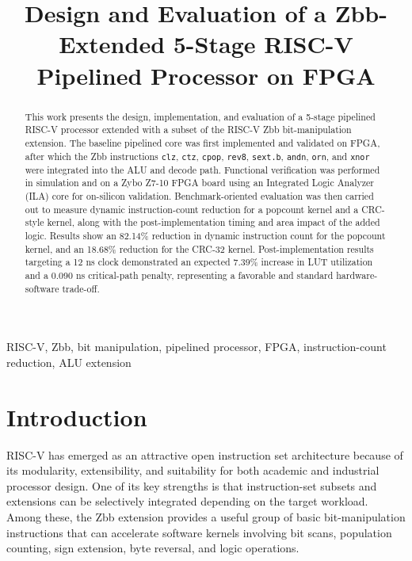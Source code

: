 \documentclass[conference]{IEEEtran}
\begin{document}
	
	\title{Design and Evaluation of a Zbb-Extended 5-Stage RISC-V Pipelined Processor on FPGA}
	
	\author{
	}
	
	\maketitle
	
	\begin{abstract}
		This work presents the design, implementation, and evaluation of a 5-stage pipelined RISC-V processor extended with a subset of the RISC-V Zbb bit-manipulation extension. The baseline pipelined core was first implemented and validated on FPGA, after which the Zbb instructions \texttt{clz}, \texttt{ctz}, \texttt{cpop}, \texttt{rev8}, \texttt{sext.b}, \texttt{andn}, \texttt{orn}, and \texttt{xnor} were integrated into the ALU and decode path. Functional verification was performed in simulation and on a Zybo Z7-10 FPGA board using an Integrated Logic Analyzer (ILA) core for on-silicon validation. Benchmark-oriented evaluation was then carried out to measure dynamic instruction-count reduction for a popcount kernel and a CRC-style kernel, along with the post-implementation timing and area impact of the added logic. Results show an 82.14\% reduction in dynamic instruction count for the popcount kernel, and an 18.68\% reduction for the CRC-32 kernel. Post-implementation results targeting a 12 ns clock demonstrated an expected 7.39\% increase in LUT utilization and a 0.090 ns critical-path penalty, representing a favorable and standard hardware-software trade-off.
	\end{abstract}
	
	\begin{IEEEkeywords}
		RISC-V, Zbb, bit manipulation, pipelined processor, FPGA, instruction-count reduction, ALU extension
	\end{IEEEkeywords}
	
	\section{Introduction}
	RISC-V has emerged as an attractive open instruction set architecture because of its modularity, extensibility, and suitability for both academic and industrial processor design. One of its key strengths is that instruction-set subsets and extensions can be selectively integrated depending on the target workload. Among these, the Zbb extension provides a useful group of basic bit-manipulation instructions that can accelerate software kernels involving bit scans, population counting, sign extension, byte reversal, and logic operations.
	
\end{document}
